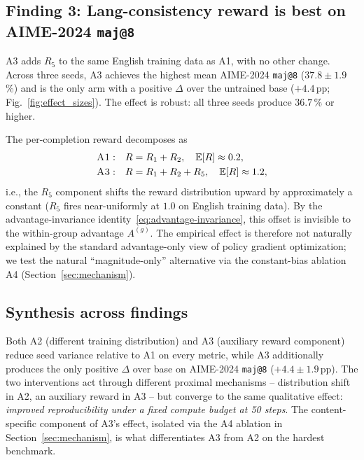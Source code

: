 \documentclass[journal,onecolumn,11pt]{IEEEtran}
\newcommand{\armA}{\textsc{A1}}
\newcommand{\armB}{\textsc{A2}}
\newcommand{\armC}{\textsc{A3}}
\newcommand{\armD}{\textsc{A4}}
\newcommand{\R}[1]{R_{#1}}
\newcommand{\E}{\mathbb{E}}
\begin{document}
\subsection{Finding 3: Lang-consistency reward is best on AIME-2024
\texttt{maj@8}}
\label{sec:finding3}
\armC{} adds $\R{5}$ to the same English training data as \armA{}, with
no other change. Across three seeds, \armC{} achieves the highest mean
AIME-2024 \texttt{maj@8} ($37.8 \pm 1.9$\,\%) and is the only arm with a
positive $\Delta$ over the untrained base ($+4.4$\,pp;
Fig.~\ref{fig:effect_sizes}). The effect is robust: all three seeds
produce $36.7$\,\% or higher.

The per-completion reward decomposes as
\begin{align*}
\armA{}: \quad & R = \R{1} + \R{2}, \quad \E[R]\approx 0.2, \\
\armC{}: \quad & R = \R{1} + \R{2} + \R{5}, \quad \E[R]\approx 1.2,
\end{align*}
i.e., the $\R{5}$ component shifts the reward distribution upward by
approximately a constant ($\R{5}$ fires near-uniformly at $1.0$ on
English training data). By the advantage-invariance
identity~\eqref{eq:advantage-invariance}, this offset is invisible to the
within-group advantage $A^{(g)}$. The empirical effect is therefore not
naturally explained by the standard advantage-only view of policy
gradient optimization; we test the natural ``magnitude-only'' alternative
via the constant-bias ablation \armD{} (Section~\ref{sec:mechanism}).

\subsection{Synthesis across findings}
\label{sec:synthesis}
Both \armB{} (different training distribution) and \armC{} (auxiliary
reward component) reduce seed variance relative to \armA{} on every
metric, while \armC{} additionally produces the only positive
$\Delta$ over base on AIME-2024 \texttt{maj@8} ($+4.4 \pm 1.9$\,pp).
The two interventions act through different proximal mechanisms --
distribution shift in \armB{}, an auxiliary reward in \armC{} -- but
converge to the same qualitative effect: \emph{improved
reproducibility under a fixed compute budget at 50 steps}. The
content-specific component of \armC{}'s effect, isolated via the
\armD{} ablation in Section~\ref{sec:mechanism}, is what differentiates
\armC{} from \armB{} on the hardest benchmark.

\end{document}
